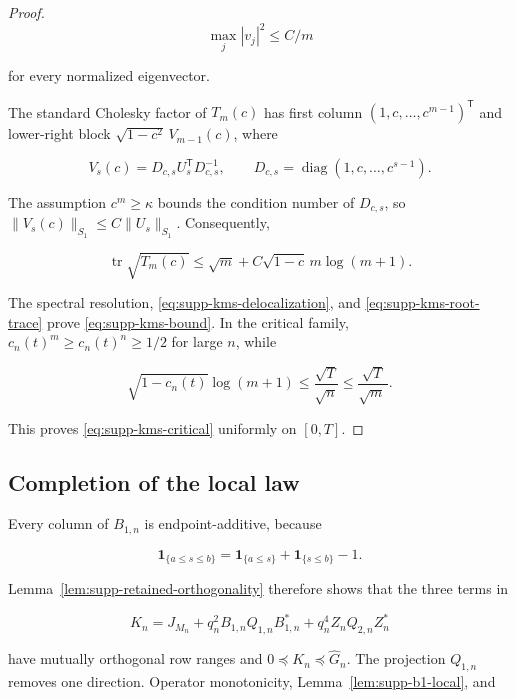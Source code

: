 \begin{proof}
\begin{equation}\label{eq:supp-kms-delocalization}
 \max_j|v_j|^2\le C/m
\end{equation}

for every normalized eigenvector.

The standard Cholesky factor of \(T_m(c)\) has first column
\((1,c,\ldots,c^{m-1})^{\mathsf T}\) and lower-right block
\(\sqrt{1-c^2}\,V_{m-1}(c)\), where

\[
 V_s(c)=D_{c,s}U_s^{\mathsf T}D_{c,s}^{-1},
 \qquad D_{c,s}=\operatorname{diag}(1,c,\ldots,c^{s-1}).
\]

The assumption \(c^m\ge\kappa\) bounds the condition number of
\(D_{c,s}\), so \(\|V_s(c)\|_{S_1}\le C\|U_s\|_{S_1}\).  Consequently,

\begin{equation}\label{eq:supp-kms-root-trace}
 \operatorname{tr}\sqrt{T_m(c)}
 \le\sqrt m+C\sqrt{1-c}\,m\log(m+1).
\end{equation}

The spectral resolution, \eqref{eq:supp-kms-delocalization}, and
\eqref{eq:supp-kms-root-trace} prove \eqref{eq:supp-kms-bound}.  In the
critical family, \(c_n(t)^m\ge c_n(t)^n\ge1/2\) for large \(n\), while

\[
 \sqrt{1-c_n(t)}\log(m+1)
 \le\frac{\sqrt T}{\sqrt n}\le\frac{\sqrt T}{\sqrt m\,}.
\]

This proves \eqref{eq:supp-kms-critical} uniformly on \([0,T]\).
\end{proof}

\subsection{Completion of the local law}

Every column of \(B_{1,n}\) is endpoint-additive, because

\[
 \mathbf1_{\{a\le s\le b\}}
 =\mathbf1_{\{a\le s\}}+\mathbf1_{\{s\le b\}}-1.
\]

Lemma~\ref{lem:supp-retained-orthogonality} therefore shows that the three
terms in

\begin{equation}\label{eq:supp-retained-operator}
 K_n=J_{M_n}+q_n^2B_{1,n}Q_{1,n}B_{1,n}^*
 +q_n^4Z_nQ_{2,n}Z_n^*
\end{equation}

have mutually orthogonal row ranges and \(0\preceq K_n\preceq\widehat G_n\).
The projection \(Q_{1,n}\) removes one direction.  Operator monotonicity,
Lemma~\ref{lem:supp-b1-local}, and

